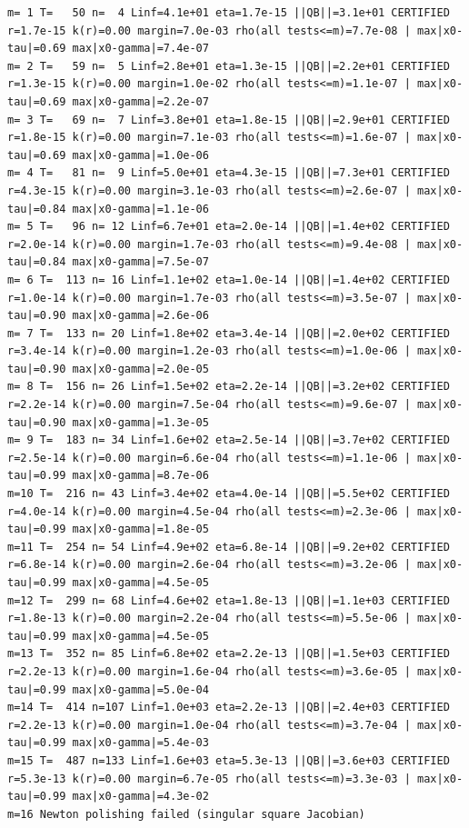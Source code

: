 \documentclass[11pt,reqno]{amsart}
\numberwithin{equation}{section}
\theoremstyle{plain}
\theoremstyle{definition}
\theoremstyle{remark}
\begin{document}
\begin{lstlisting}[style=out]
m= 1 T=   50 n=  4 Linf=4.1e+01 eta=1.7e-15 ||QB||=3.1e+01 CERTIFIED r=1.7e-15 k(r)=0.00 margin=7.0e-03 rho(all tests<=m)=7.7e-08 | max|x0-tau|=0.69 max|x0-gamma|=7.4e-07
m= 2 T=   59 n=  5 Linf=2.8e+01 eta=1.3e-15 ||QB||=2.2e+01 CERTIFIED r=1.3e-15 k(r)=0.00 margin=1.0e-02 rho(all tests<=m)=1.1e-07 | max|x0-tau|=0.69 max|x0-gamma|=2.2e-07
m= 3 T=   69 n=  7 Linf=3.8e+01 eta=1.8e-15 ||QB||=2.9e+01 CERTIFIED r=1.8e-15 k(r)=0.00 margin=7.1e-03 rho(all tests<=m)=1.6e-07 | max|x0-tau|=0.69 max|x0-gamma|=1.0e-06
m= 4 T=   81 n=  9 Linf=5.0e+01 eta=4.3e-15 ||QB||=7.3e+01 CERTIFIED r=4.3e-15 k(r)=0.00 margin=3.1e-03 rho(all tests<=m)=2.6e-07 | max|x0-tau|=0.84 max|x0-gamma|=1.1e-06
m= 5 T=   96 n= 12 Linf=6.7e+01 eta=2.0e-14 ||QB||=1.4e+02 CERTIFIED r=2.0e-14 k(r)=0.00 margin=1.7e-03 rho(all tests<=m)=9.4e-08 | max|x0-tau|=0.84 max|x0-gamma|=7.5e-07
m= 6 T=  113 n= 16 Linf=1.1e+02 eta=1.0e-14 ||QB||=1.4e+02 CERTIFIED r=1.0e-14 k(r)=0.00 margin=1.7e-03 rho(all tests<=m)=3.5e-07 | max|x0-tau|=0.90 max|x0-gamma|=2.6e-06
m= 7 T=  133 n= 20 Linf=1.8e+02 eta=3.4e-14 ||QB||=2.0e+02 CERTIFIED r=3.4e-14 k(r)=0.00 margin=1.2e-03 rho(all tests<=m)=1.0e-06 | max|x0-tau|=0.90 max|x0-gamma|=2.0e-05
m= 8 T=  156 n= 26 Linf=1.5e+02 eta=2.2e-14 ||QB||=3.2e+02 CERTIFIED r=2.2e-14 k(r)=0.00 margin=7.5e-04 rho(all tests<=m)=9.6e-07 | max|x0-tau|=0.90 max|x0-gamma|=1.3e-05
m= 9 T=  183 n= 34 Linf=1.6e+02 eta=2.5e-14 ||QB||=3.7e+02 CERTIFIED r=2.5e-14 k(r)=0.00 margin=6.6e-04 rho(all tests<=m)=1.1e-06 | max|x0-tau|=0.99 max|x0-gamma|=8.7e-06
m=10 T=  216 n= 43 Linf=3.4e+02 eta=4.0e-14 ||QB||=5.5e+02 CERTIFIED r=4.0e-14 k(r)=0.00 margin=4.5e-04 rho(all tests<=m)=2.3e-06 | max|x0-tau|=0.99 max|x0-gamma|=1.8e-05
m=11 T=  254 n= 54 Linf=4.9e+02 eta=6.8e-14 ||QB||=9.2e+02 CERTIFIED r=6.8e-14 k(r)=0.00 margin=2.6e-04 rho(all tests<=m)=3.2e-06 | max|x0-tau|=0.99 max|x0-gamma|=4.5e-05
m=12 T=  299 n= 68 Linf=4.6e+02 eta=1.8e-13 ||QB||=1.1e+03 CERTIFIED r=1.8e-13 k(r)=0.00 margin=2.2e-04 rho(all tests<=m)=5.5e-06 | max|x0-tau|=0.99 max|x0-gamma|=4.5e-05
m=13 T=  352 n= 85 Linf=6.8e+02 eta=2.2e-13 ||QB||=1.5e+03 CERTIFIED r=2.2e-13 k(r)=0.00 margin=1.6e-04 rho(all tests<=m)=3.6e-05 | max|x0-tau|=0.99 max|x0-gamma|=5.0e-04
m=14 T=  414 n=107 Linf=1.0e+03 eta=2.2e-13 ||QB||=2.4e+03 CERTIFIED r=2.2e-13 k(r)=0.00 margin=1.0e-04 rho(all tests<=m)=3.7e-04 | max|x0-tau|=0.99 max|x0-gamma|=5.4e-03
m=15 T=  487 n=133 Linf=1.6e+03 eta=5.3e-13 ||QB||=3.6e+03 CERTIFIED r=5.3e-13 k(r)=0.00 margin=6.7e-05 rho(all tests<=m)=3.3e-03 | max|x0-tau|=0.99 max|x0-gamma|=4.3e-02
m=16 Newton polishing failed (singular square Jacobian)
\end{lstlisting}
\end{document}
